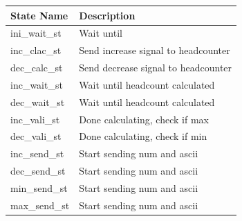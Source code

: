 \documentclass[12pt,a4 paper] {report}
\begin{document}
\begin{center}
 \begin{tabular}{| p{4cm} | p{7cm} |}
	 \hline
	 \textbf{State Name} & \textbf{Description} \\
	 \hline
	 ini\_wait\_st & Wait until \\
	 \hline
	 inc\_clac\_st & Send increase signal to headcounter \\
	 \hline
	 dec\_calc\_st & Send decrease signal to headcounter \\
	 \hline
	 inc\_wait\_st & Wait until headcount calculated \\
	 \hline
	 dec\_wait\_st & Wait until headcount calculated \\
	 \hline
	 inc\_vali\_st & Done calculating, check if max \\
	 \hline
	 dec\_vali\_st & Done calculating, check if min \\
	 \hline
	 inc\_send\_st & Start sending num and ascii \\
	 \hline
	 dec\_send\_st & Start sending num and ascii \\
	 \hline
	 min\_send\_st & Start sending num and ascii \\
	 \hline
	 max\_send\_st & Start sending num and ascii \\
	 \hline
 \end{tabular}
\end{center}

\newpage
\end{document}
